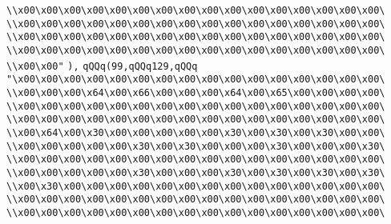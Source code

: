 \verb|\\x00\x00\x00\x00\x00\x00\x00\x00\x00\x00\x00\x00\x00\x00\x00\x00\|\newline
\verb|\\x00\x00\x00\x00\x00\x00\x00\x00\x00\x00\x00\x00\x00\x00\x00\x00\|\newline
\verb|\\x00\x00\x00\x00\x00\x00\x00\x00\x00\x00\x00\x00\x00\x00\x00\x00\|\newline
\verb|\\x00\x00\x00\x00\x00\x00\x00\x00\x00\x00\x00\x00\x00\x00\x00\x00\|\newline
\verb|\\x00\x00"|\newline
\verb|),|\newline
\verb|qQQq(99,qQQq129,qQQq|\newline
\verb|"\x00\x00\x00\x00\x00\x00\x00\x00\x00\x00\x00\x00\x00\x00\x00\x00\|\newline
\verb|\\x00\x00\x00\x64\x00\x66\x00\x00\x00\x64\x00\x65\x00\x00\x00\x00\|\newline
\verb|\\x00\x00\x00\x00\x00\x00\x00\x00\x00\x00\x00\x00\x00\x00\x00\x00\|\newline
\verb|\\x00\x00\x00\x00\x00\x00\x00\x00\x00\x00\x00\x00\x00\x00\x00\x00\|\newline
\verb|\\x00\x64\x00\x30\x00\x00\x00\x00\x00\x30\x00\x30\x00\x30\x00\x00\|\newline
\verb|\\x00\x00\x00\x00\x00\x30\x00\x30\x00\x00\x00\x30\x00\x00\x00\x30\|\newline
\verb|\\x00\x00\x00\x00\x00\x00\x00\x00\x00\x00\x00\x00\x00\x00\x00\x00\|\newline
\verb|\\x00\x00\x00\x00\x00\x30\x00\x00\x00\x30\x00\x30\x00\x30\x00\x30\|\newline
\verb|\\x00\x30\x00\x00\x00\x00\x00\x00\x00\x00\x00\x00\x00\x00\x00\x00\|\newline
\verb|\\x00\x00\x00\x00\x00\x00\x00\x00\x00\x00\x00\x00\x00\x00\x00\x00\|\newline
\verb|\\x00\x00\x00\x00\x00\x00\x00\x00\x00\x00\x00\x00\x00\x00\x00\x00\|\newline
